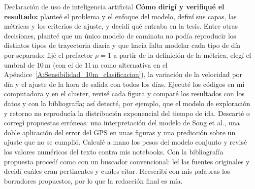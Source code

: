 \documentclass[12pt,screen,twoside,pagebackref]{ibtesis}
\begin{document}
\begin{postliminary}
\begin{seccion}{Declaración de uso de inteligencia artificial}
\textbf{Cómo dirigí y verifiqué el resultado:} planteé el problema y el enfoque del modelo, definí sus capas, las métricas y los criterios de ajuste, 
y decidí qué entraba en la tesis. Entre otras decisiones, planteé que un único modelo de caminata no podía reproducir los distintos tipos de trayectoria 
diaria y que hacía falta modelar cada tipo de día por separado; fijé el prefactor $\rho = 1$ a partir de la definición de la métrica, elegí el umbral 
de $10\,\mathrm{m}$ (con el de $11\,\mathrm{m}$ como alternativa en el Apéndice~\ref{A:Sensibilidad_10m_clasificacion}), la variación de la velocidad 
por día y el ajuste de la hora de salida con todos los días. Ejecuté los códigos en mi computadora y en el cluster, revisé cada figura y comparé los 
resultados con los datos y con la bibliografía; así detecté, por ejemplo, que el modelo de exploración y retorno no reproducía la distribución exponencial 
del tiempo de ida. Descarté o corregí propuestas erróneas: una interpretación del modelo de Song et al., una doble aplicación del error del GPS en unas 
figuras y una predicción sobre un ajuste que no se cumplió. Calculé a mano los pesos del modelo conjunto y revisé los valores numéricos del texto contra 
mis notebooks. Con la bibliografía propuesta procedí como con un buscador convencional: leí las fuentes originales y decidí cuáles eran pertinentes y 
cuáles citar. Reescribí con mis palabras los borradores propuestos, por lo que la redacción final es mía.

\end{seccion}

\end{postliminary}
\end{document}
